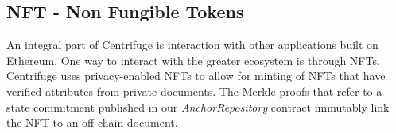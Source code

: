 \subsection{NFT - Non Fungible Tokens}
An integral part of Centrifuge is interaction with other applications built on Ethereum. One way to interact with the greater ecosystem is through NFTs. Centrifuge uses privacy-enabled NFTs\cite{centrifuge2018nft} to allow for minting of NFTs that have verified attributes from private documents. The Merkle proofs that refer to a state commitment published in our \textit{AnchorRepository} contract immutably link the NFT to an off-chain document.

